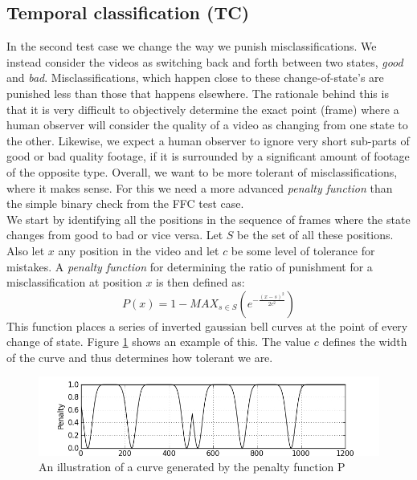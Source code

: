 \subsection{Temporal classification (TC)}\label{sec:tempclass}
%
In the second test case we change the way we punish misclassifications. We instead consider the videos as switching back and forth between two states, \textit{good} and \textit{bad}. Misclassifications, which happen close to these change-of-state's are punished less than those that happens elsewhere. The rationale behind this is that it is very difficult to objectively determine the exact point (frame) where a human observer will consider the quality of a video as changing from one state to the other. Likewise, we expect a human observer to ignore very short sub-parts of good or bad quality footage, if it is surrounded by a significant amount of footage of the opposite type. Overall, we want to be more tolerant of misclassifications, where it makes sense. For this we need a more advanced \textit{penalty function} than the simple binary check from the FFC test case.\\
%
We start by identifying all the positions in the sequence of frames where the state changes from good to bad or vice versa. Let $S$ be the set of all these positions. Also let $x$ any position in the video and let $c$ be some level of tolerance for mistakes. A \emph{penalty function} for determining the ratio of punishment for a misclassification at position $x$ is then defined as:
%
\begin{displaymath}
P(x) =1 - MAX_{s\in S}(e^{-\frac{(x-s)^{2}}{2c^{2}}})
\end{displaymath}
%
This function places a series of inverted gaussian bell curves at the point of every change of state. Figure \ref{fig:penaltycurve} shows an example of this. The value $c$ defines the width of the curve and thus determines how tolerant we are.
%
%
\begin{figure}
\includegraphics[width=1\textwidth]{img/penaltyfunction.jpg}
\caption{An illustration of a curve generated by the penalty function P}
\label{fig:penaltycurve}
\end{figure}
%
